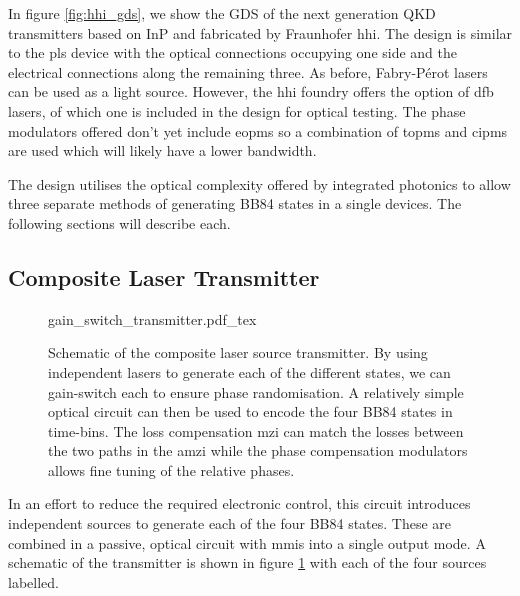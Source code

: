 

In figure \ref{fig:hhi_gds}, we show the GDS of the next generation \ac{QKD} transmitters based on \ac{InP} and fabricated by Fraunhofer \ac{hhi}. The design is similar to the \ac{pls} device with the optical connections occupying one side and the electrical connections along the remaining three. As before, Fabry-P\'{e}rot lasers can be used as a light source. However, the \ac{hhi} foundry offers the option of \ac{dfb} lasers, of which one is included in the design for optical testing. The phase modulators offered don't yet include \acp{eopm} so a combination of \acp{topm} and \acp{cipm} are used which will likely have a lower bandwidth.

The design utilises the optical complexity offered by integrated photonics to allow three separate methods of generating BB84 states in a single devices. The following sections will describe each.

\subsection{Composite Laser Transmitter}

\begin{figure}[t]
	\centering
	\def\svgwidth{\textwidth}
	{gain_switch_transmitter.pdf_tex}
		\caption[Schematic of the composite laser source transmitter]{Schematic of the composite laser source transmitter. By using independent lasers to generate each of the different states, we can gain-switch each to ensure phase randomisation. A relatively simple optical circuit can then be used to encode the four BB84 states in time-bins. The loss compensation \acs{mzi} can match the losses between the two paths in the \acs{amzi} while the phase compensation modulators allows fine tuning of the relative phases.}
	\label{fig:multiple_lasers_tx}
\end{figure}

In an effort to reduce the required electronic control, this circuit introduces independent sources to generate each of the four BB84 states. These are combined in a passive, optical circuit with \acp{mmi} into a single output mode. A schematic of the transmitter is shown in figure \ref{fig:multiple_lasers_tx} with each of the four sources labelled. 


